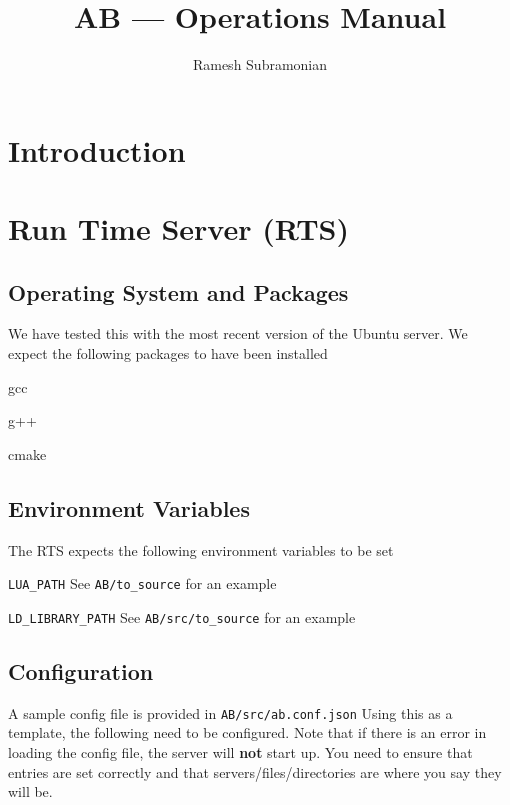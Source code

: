 \documentclass[letterpaper]{article}
\begin{document}
\title{AB --- Operations Manual}
\author{ Ramesh Subramonian }
\maketitle
\thispagestyle{fancy}
\lhead{}
\chead{}
\rhead{}
\cfoot{}
\rfoot{{\small \thepage}}
\section{Introduction}

\section{Run Time Server (RTS)}

\subsection{Operating System and Packages}
We have tested this with the most recent version of the Ubuntu server. We expect
the following packages to have been installed
\be
\item gcc
\item g++
\item cmake
\ee


\subsection{Environment Variables}

The RTS expects the following environment variables to be set
\be
\item \verb+LUA_PATH+ 
  See \verb+AB/to_source+ for an example
\item \verb+LD_LIBRARY_PATH+
  See \verb+AB/src/to_source+ for an example
  \ee


\subsection{Configuration}
A sample config file is provided in 
\verb+AB/src/ab.conf.json+ Using this as a template, the following need to be
configured. Note that if there is an error in loading the config file, the
server will {\bf not} start up. You need to ensure that entries are set
correctly and that servers/files/directories are where you say they will be.
\end{document}
